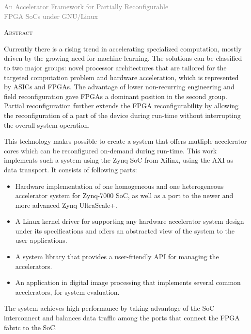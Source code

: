 \cleardoublepage
\rm
\begin{center}
	\textcolor{gray} {\large
		An Accelerator Framework for Partially Reconfigurable\\
		FPGA SoCs under GNU/Linux\\
	}

	\vspace{20pt}
	\textsc{\large Abstract}\\
	\vspace{0pt}
\end{center}

Currently there is a rising trend in accelerating specialized computation,
mostly driven by the growing need for machine learning. The solutions can
be classified to two major groups: novel processor architectures that are tailored
for the targeted computation problem and hardware acceleration, which is represented
by ASICs and FPGAs. The advantage of lower non-recurring engineering and field reconfiguration
gave FPGAs a dominant position in the second group. Partial reconfiguration further extends
the FPGA reconfigurability by allowing the reconfiguration of a part of the device
during run-time without interrupting the overall system operation.

This technology makes possible to create a system that offers mutliple accelerator cores
which can be reconfigured on-demand during run-time.
This work implements such a system using the Zynq SoC from Xilinx, using the AXI as data transport.
It consists of following parts:

\begin{itemize}
\item	Hardware implementation of one homogeneous and one heterogeneous accelerator system for Zynq-7000 SoC,
	as well as a port to the newer and more advanced Zynq UltraScale+.
\item	A Linux kernel driver for supporting any hardware accelerator system design under its specifications
	and offers an abstracted view of the system to the user applications.
\item	A system library that provides a user-friendly API for managing the accelerators.
\item	An application in digital image processing that implements 
	several common accelerators, for system evaluation.
\end{itemize}

The system achieves high performance by taking advantage of the SoC interconnect and 
balances data traffic among the ports that connect the FPGA fabric to the SoC.

